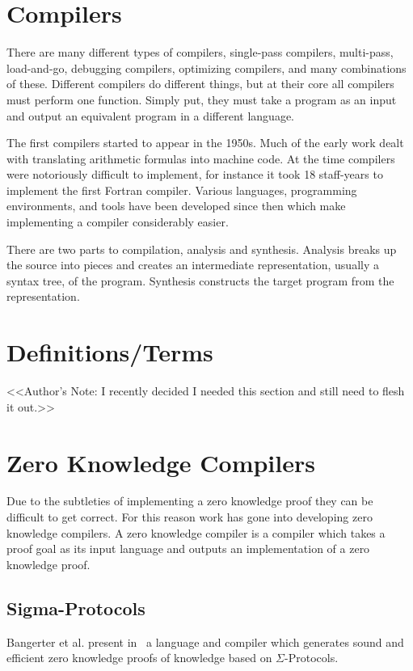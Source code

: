\documentclass{sig-alternate}
\begin{document}
\section{Compilers}
	There are many different types of compilers, single-pass compilers, multi-pass,
	load-and-go, debugging compilers, optimizing compilers, and many combinations
	of these. Different compilers do different things, but at their core all 
	compilers must perform one function. Simply put, they must take a program as 
	an input and output	an equivalent program in a different
	language.~\cite{Compiler:1986} 
	
	The first compilers started to appear in the 1950s. Much of the early work
	dealt with translating arithmetic formulas into machine code. At the time
	compilers were notoriously difficult to implement, for instance it took
	18 staff-years to implement the first Fortran compiler. Various languages,
	programming	environments, and tools have been developed since then which
	make implementing a compiler considerably easier.
	
	There are two parts to compilation, analysis and synthesis. Analysis breaks
	up the source into pieces and creates an intermediate representation, usually
	a syntax tree, of the program. Synthesis constructs the target program from
    the representation.
    
\section{Definitions/Terms}
	<<Author's Note: I recently decided I needed this section and still need
	to flesh it out.>>    
    

\section{Zero Knowledge Compilers}
	Due to the subtleties of implementing a zero knowledge proof they
	can be difficult to get correct. For this reason work has gone into
	developing zero knowledge compilers. A zero knowledge compiler is a
	compiler which takes a proof goal as its input language
	and outputs an implementation of a zero knowledge proof.

	\subsection{Sigma-Protocols}
		Bangerter et al. present in~\cite{Sigma:2009} a language and compiler
		which generates sound and efficient zero knowledge proofs of knowledge
		based on $\Sigma$-Protocols.	
	
\end{document}
